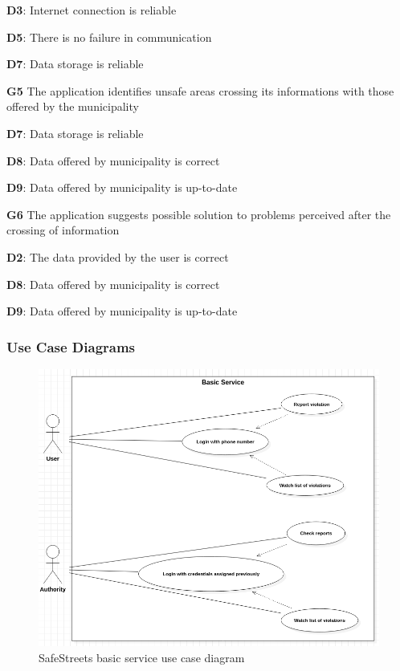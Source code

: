 \begin{outline}
\2 \textbf{D3}: Internet connection is reliable

\2 \textbf{D5}: There is no failure in communication

\2 \textbf{D7}: Data storage is reliable


\1  \textbf{G5} The application identifies unsafe areas crossing its informations with those offered by the municipality

\2 \textbf{D7}: Data storage is reliable

\2 \textbf{D8}: Data offered by municipality is correct

\2 \textbf{D9}: Data offered by municipality is up-to-date



\1  \textbf{G6} The application suggests possible solution to problems perceived after the crossing of information

\2 \textbf{D2}: The data provided by the user is correct

\2 \textbf{D8}: Data offered by municipality is correct

\2 \textbf{D9}: Data offered by municipality is up-to-date

\end{outline}

\subsubsection{Use Case Diagrams}
\begin{figure}[H]
\includegraphics[scale=0.41]{Images/Diagrams/UseCase1.png}
\caption{\label{fig:UseCase1}SafeStreets basic service use case diagram}
\end{figure}

